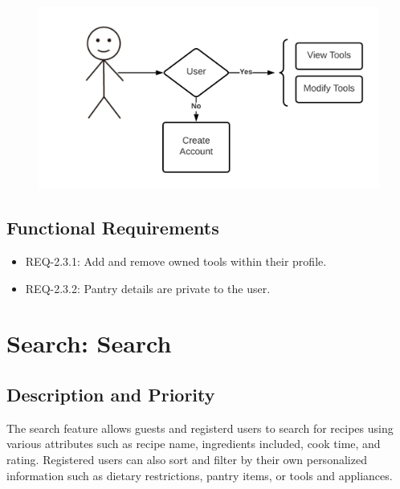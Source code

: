 \documentclass{scrreprt}
\begin{document}
\begin{figure}[H]\centering
    \includegraphics[width=\columnwidth]{FlowCharts/Profile-Tools.png}
\end{figure}

\subsection{Functional Requirements}

\begin{itemize}
    \item REQ-2.3.1: Add and remove owned tools within their profile.
    \item REQ-2.3.2: Pantry details are private to the user.
\end{itemize}

\section{Search: Search}

\subsection{Description and Priority}

The search feature allows guests and registerd users to search for recipes using various attributes such as recipe name, ingredients included, cook time, and rating. Registered users can also sort and filter by their own personalized information such as dietary restrictions, pantry items, or tools and appliances.
\end{document}
